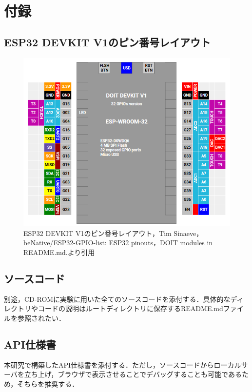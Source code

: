 \section{付録}
  \label{付録}
    \subsection{ESP32 DEVKIT V1のピン番号レイアウト}
      \label{sec:ESP32 DEVKIT V1のピン番号レイアウト}
        \begin{figure}[htbp]
          \centering
          \includegraphics[scale=1]
          {figures/DOIT-DEVKIT-V1-32.png}
          \caption{ESP32 DEVKIT V1のピン番号レイアウト，Tim Sinaeve，beNative/ESP32-GPIO-list: ESP32 pinouts，DOIT modules in README.md.より引用}
          \label{fig:ピン番号レイアウト}
        \end{figure}
  
       \subsection{ソースコード}
        \label{sec:ソースコード}
         \par 別途，CD-ROMに実験に用いた全てのソースコードを添付する．具体的なディレクトリやコードの説明はルートディレクトリに保存するREADME.mdファイルを参照されたい．

       \subsection{API仕様書}
        \label{sec:API仕様書}
         \par 本研究で構築したAPI仕様書を添付する．ただし，ソースコードからローカルサーバを立ち上げ，ブラウザで表示させることでデバッグすることも可能であるため，そちらを推奨する．
    
